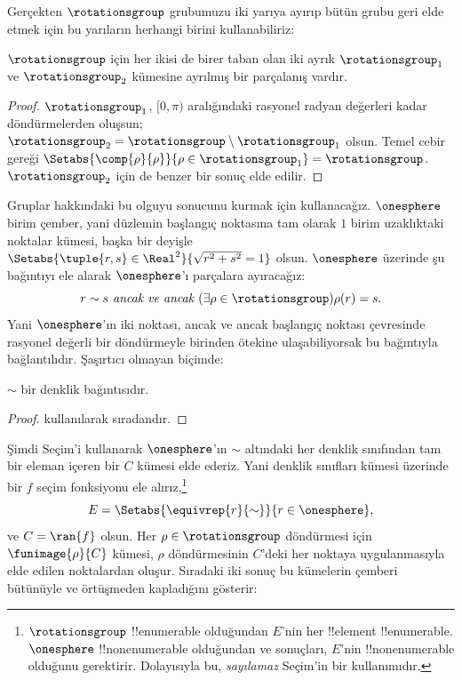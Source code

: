 \documentclass[../../../include/open-logic-section]{subfiles}
\begin{document}
Gerçekten $\rotationsgroup$ grubumuzu iki yarıya ayırıp bütün grubu geri
elde etmek için bu yarıların herhangi birini kullanabiliriz:

\begin{lem}
$\rotationsgroup$ için her ikisi de birer taban olan iki ayrık
$\rotationsgroup_{1}$ ve $\rotationsgroup_{2}$ kümesine ayrılmış bir
parçalanış vardır.
\end{lem}

\begin{proof}
$\rotationsgroup_{1}$, $[0,\pi)$ aralığındaki rasyonel radyan değerleri
kadar döndürmelerden oluşsun;
$\rotationsgroup_2=\rotationsgroup\setminus\rotationsgroup_1$ olsun.
Temel cebir gereği
$\Setabs{\comp{\rho}{\rho}}{\rho\in\rotationsgroup_1}=
\rotationsgroup$. $\rotationsgroup_2$ için de benzer bir sonuç elde edilir.
\end{proof}

Gruplar hakkındaki bu olguyu  sonucunu kurmak için
kullanacağız. $\onesphere$ birim çember, yani düzlemin başlangıç noktasına
tam olarak $1$ birim uzaklıktaki noktalar kümesi, başka bir deyişle
$\Setabs{\tuple{r,s}\in\Real^2}{\sqrt{r^2+s^2}=1}$ olsun. $\onesphere$
üzerinde şu bağıntıyı ele alarak $\onesphere$'ı parçalara ayıracağız:
\[
	r \sim s \emph{ ancak ve ancak }(\exists \rho \in \rotationsgroup)\rho(r) = s.
\]
Yani $\onesphere$'ın iki noktası, ancak ve ancak başlangıç noktası
çevresinde rasyonel değerli bir döndürmeyle birinden ötekine
ulaşabiliyorsak bu bağıntıyla bağlantılıdır. Şaşırtıcı olmayan biçimde:

\begin{lem}
$\sim$ bir denklik bağıntısıdır.
\end{lem}

\begin{proof}
 kullanılarak sıradandır.
\end{proof}

Şimdi Seçim'i kullanarak $\onesphere$'ın $\sim$ altındaki her denklik
sınıfından tam bir eleman içeren bir $C$ kümesi elde ederiz. Yani denklik
sınıfları kümesi üzerinde bir $f$ seçim fonksiyonu ele alırız,\footnote{
$\rotationsgroup$ !!{enumerable} olduğundan $E$'nin her !!{element}
!!{enumerable}. $\onesphere$ !!{nonenumerable} olduğundan
 ve
 sonuçları, $E$'nin
!!{nonenumerable} olduğunu gerektirir. Dolayısıyla bu, \emph{sayılamaz}
Seçim'in bir kullanımıdır.}
\[
	E = \Setabs{\equivrep{r}{\sim}}{r \in \onesphere},
\]
ve $C=\ran{f}$ olsun. Her $\rho\in\rotationsgroup$ döndürmesi için
$\funimage{\rho}{C}$ kümesi, $\rho$ döndürmesinin $C$'deki her noktaya
uygulanmasıyla elde edilen noktalardan oluşur. Sıradaki iki sonuç bu
kümelerin çemberi bütünüyle ve örtüşmeden kapladığını gösterir:
\end{document}
